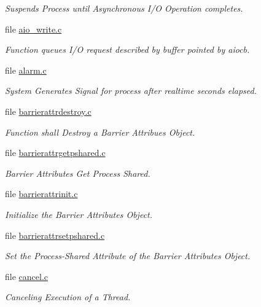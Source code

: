 \begin{DoxyCompactItemize}
\begin{DoxyCompactList}\small\item\em Suspends Process until Asynchronous I/O Operation completes. \end{DoxyCompactList}\item 
file \mbox{\hyperlink{aio__write_8c}{aio\+\_\+write.\+c}}
\begin{DoxyCompactList}\small\item\em Function queues I/O request described by buffer pointed by aiocb. \end{DoxyCompactList}\item 
file \mbox{\hyperlink{alarm_8c}{alarm.\+c}}
\begin{DoxyCompactList}\small\item\em System Generates Signal for process after realtime seconds elapsed. \end{DoxyCompactList}\item 
file \mbox{\hyperlink{barrierattrdestroy_8c}{barrierattrdestroy.\+c}}
\begin{DoxyCompactList}\small\item\em Function shall Destroy a Barrier Attribues Object. \end{DoxyCompactList}\item 
file \mbox{\hyperlink{barrierattrgetpshared_8c}{barrierattrgetpshared.\+c}}
\begin{DoxyCompactList}\small\item\em Barrier Attributes Get Process Shared. \end{DoxyCompactList}\item 
file \mbox{\hyperlink{barrierattrinit_8c}{barrierattrinit.\+c}}
\begin{DoxyCompactList}\small\item\em Initialize the Barrier Attributes Object. \end{DoxyCompactList}\item 
file \mbox{\hyperlink{barrierattrsetpshared_8c}{barrierattrsetpshared.\+c}}
\begin{DoxyCompactList}\small\item\em Set the Process-\/\+Shared Attribute of the Barrier Attributes Object. \end{DoxyCompactList}\item 
file \mbox{\hyperlink{cancel_8c}{cancel.\+c}}
\begin{DoxyCompactList}\small\item\em Canceling Execution of a Thread. \end{DoxyCompactList}\item 

\end{DoxyCompactItemize}
